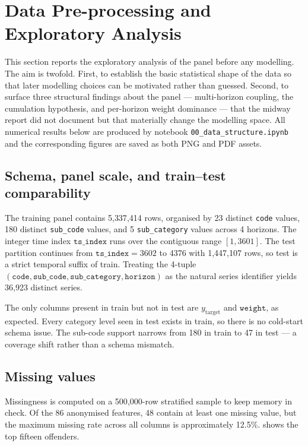 \section{Data Pre-processing and Exploratory Analysis}
\label{sec:eda}

This section reports the exploratory analysis of the panel before any modelling. The aim is twofold. First, to establish the basic statistical shape of the data so that later modelling choices can be motivated rather than guessed. Second, to surface three structural findings about the panel --- multi-horizon coupling, the cumulation hypothesis, and per-horizon weight dominance --- that the midway report did not document but that materially change the modelling space. All numerical results below are produced by notebook \texttt{00\_data\_structure.ipynb} and the corresponding figures are saved as both PNG and PDF assets.

\subsection{Schema, panel scale, and train--test comparability}
\label{sec:eda:schema}

The training panel contains 5{,}337{,}414 rows, organised by 23 distinct \texttt{code} values, 180 distinct \texttt{sub\_code} values, and 5 \texttt{sub\_category} values across 4 horizons. The integer time index $\mathtt{ts\_index}$ runs over the contiguous range $[1, 3601]$. The test partition continues from $\mathtt{ts\_index} = 3602$ to 4376 with 1{,}447{,}107 rows, so test is a strict temporal suffix of train. Treating the 4-tuple $(\mathtt{code},\mathtt{sub\_code},\mathtt{sub\_category},\mathtt{horizon})$ as the natural series identifier yields 36{,}923 distinct series.

The only columns present in train but not in test are $y_{\text{target}}$ and $\mathtt{weight}$, as expected. Every category level seen in test exists in train, so there is no cold-start schema issue. The sub-code support narrows from 180 in train to 47 in test --- a coverage shift rather than a schema mismatch.

\subsection{Missing values}
\label{sec:eda:missing}

Missingness is computed on a 500{,}000-row stratified sample to keep memory in check. Of the 86 anonymised features, 48 contain at least one missing value, but the maximum missing rate across all columns is approximately 12.5\%.  shows the top fifteen offenders.

